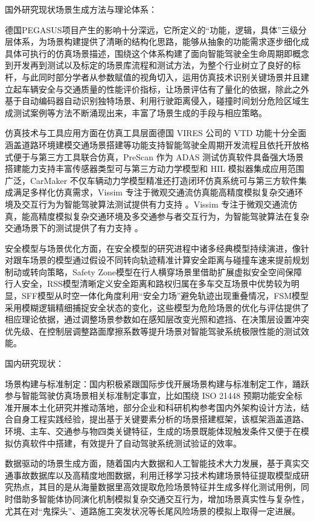 国外研究现状场景生成方法与理论体系：

德国PEGASUS项目产生的影响十分深远，它所定义的“功能，逻辑，具体”三级分层体系，为场景构建提供了清晰的结构化思路，能够从抽象的功能需求逐步细化成具体可执行的仿真场景描述，围绕这个体系构建了面向智能驾驶全生命周期即概念到开发再到测试以及标定的场景库流程和测试方法，为整个行业树立了良好的标杆\cite{hiemann2008estimating}，与此同时部分学者从参数赋值的视角切入，运用仿真技术识别关键场景并且建立起车辆安全与交通质量的性能评价指标，让场景评估有了量化的依据，除此之外基于自动编码器自动识别独特场景、利用行驶距离侵入，碰撞时间划分危险区域生成测试案例等方法不断涌现出来，丰富了场景生成的手段与相应策略。

仿真技术与工具应用方面在仿真工具层面德国 VIRES 公司的 VTD 功能十分全面涵盖道路环境建模交通场景搭建等功能支持智能驾驶全周期开发流程且依托开放格式便于与第三方工具联合仿真，PreScan 作为 ADAS 测试仿真软件具备强大场景搭建能力支持丰富传感器类型可与第三方动力学模型和 HIL 模拟器集成应用范围广泛，CarMaker 不仅车辆动力学模型精准还打造闭环仿真系统可与第三方软件集成满足多样化仿真需求，Vissim 专注于微观交通流仿真能高精度模拟复杂交通环境及交互行为为智能驾驶算法测试提供有力支持 。Vissim 专注于微观交通流仿真，能高精度模拟复杂交通环境及多交通参与者交互行为，为智能驾驶算法在复杂交通场景下的测试提供了有力支持 。

安全模型与场景优化方面，在安全模型的研究进程中诸多经典模型持续演进，像针对跟车场景的模型通过假设不同转向轨迹精准计算安全距离与碰撞车速来提前规划制动或转向策略，Safety Zone模型在行人横穿场景里借助扩展虚拟安全空间保障行人安全，RSS模型清晰定义安全距离和路权归属在多车交互场景中优势较为明显，SFF模型从时空一体化角度利用“安全力场”避免轨迹出现重叠情况，FSM模型采用模糊逻辑精细捕捉安全状态的变化，这些模型为危险场景的优化与评估提供了相应理论依据，通过调整场景参数如在感知层改变光照和遮挡、在决策层设置冲突优先级、在控制层调整路面摩擦系数等提升场景对智能驾驶系统极限性能的测试效能。

国内研究现状：

场景构建与标准制定：国内积极紧跟国际步伐开展场景构建与标准制定工作，踊跃参与智能驾驶仿真场景相关标准制定事宜，比如围绕 ISO 21448 预期功能安全标准开展本土化研究并推动落地，部分企业和科研机构参考国内外架构设计方法，结合自身工程实践经验，提出基于关键要素分析的场景搭建框架，该框架涵盖道路、环境、主车、交通参与物四类关键特征，生成的场景既能体现触发条件又便于在模拟仿真软件中搭建，有效提升了自动驾驶系统测试验证的效率\cite{薛薇2009SPSS}。

数据驱动的场景生成方面，随着国内大数据和人工智能技术大力发展，基于真实交通事故数据库以及高精度地图数据，利用迁移学习技术构建场景特征提取模型成研究热点，其目的是从海量数据里高效提取危险场景特征并生成多样化测试用例，同时借助多智能体协同演化机制模拟复杂交通交互行为，增加场景真实性与复杂性，尤其在对“鬼探头”、道路施工突发状况等长尾风险场景的模拟上取得一定进展。


